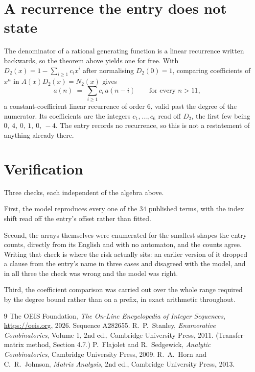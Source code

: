 \documentclass[11pt,a4paper]{article}
\theoremstyle{plain}
\theoremstyle{definition}
\begin{document}
\section{A recurrence the entry does not state}

The denominator of a rational generating function is a linear recurrence written backwards, so
the theorem above yields one for free. With $D_2(x)=1-\sum_{i\ge1}c_ix^i$ after normalising
$D_2(0)=1$, comparing coefficients of $x^n$ in $A(x)D_2(x)=N_2(x)$ gives
\[
a(n)\;=\;\sum_{i\ge1}c_i\,a(n-i)\qquad\text{for every }n>11,
\]
a constant-coefficient linear recurrence of order $6$, valid past the degree of the
numerator. Its coefficients are the integers $c_1,\dots,c_{6}$ read off $D_2$, the first few being $0,\ 4,\ 0,\ 1,\ 0,\ -4$. The entry records no recurrence, so this is not a restatement of anything
already there.

\section{Verification}

Three checks, each independent of the algebra above.

First, the model reproduces every one of the $34$ published terms, with the index shift
read off the entry's offset rather than fitted.

Second, the arrays themselves were enumerated for the smallest shapes the entry counts,
directly from its English and with no automaton, and the counts agree. Writing that check is
where the risk actually sits: an earlier version of it dropped a clause from the entry's name
in three cases and disagreed with the model, and in all three the check was wrong and the model
was right.

Third, the coefficient comparison was carried out over the whole range required by the degree
bound rather than on a prefix, in exact arithmetic throughout.

\begin{thebibliography}{9}
 The OEIS Foundation, \emph{The On-Line Encyclopedia of Integer
Sequences}, \url{https://oeis.org}, 2026. Sequence A282655.
 R.~P.~Stanley, \emph{Enumerative Combinatorics}, Volume 1, 2nd ed.,
Cambridge University Press, 2011. (Transfer-matrix method, Section 4.7.)
 P.~Flajolet and R.~Sedgewick, \emph{Analytic Combinatorics}, Cambridge
University Press, 2009.
 R.~A.~Horn and C.~R.~Johnson, \emph{Matrix Analysis}, 2nd ed., Cambridge
University Press, 2013.
\end{thebibliography}
\end{document}
